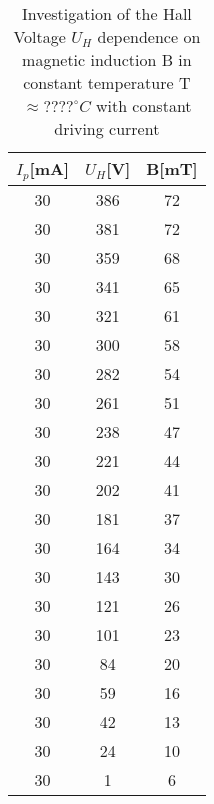 \documentclass[a4paper,12pt]{article}
\begin{document}
\begin{table}[H]
\caption{Investigation of the Hall Voltage $U_H$ dependence on magnetic induction B in constant temperature T$\approx????^\circ C$ with constant driving current}
\begin{minipage}{.5\linewidth}
\centering
\begin{tabular}{|c|c|c|}
\hline
$I_p$[mA] & $U_H$[V] & B[mT] \\   
\hline
\hline
30    & 386	& 72\\
\hline
30    & 381	&	72\\
\hline
30    & 359	&	68\\
\hline
30    & 341	&	65\\
\hline
30    & 321	&	61\\
\hline
30    & 300	&	58\\
\hline
30    & 282	&	54\\
\hline
30    & 261	&	51\\
\hline
30    & 238	&	47\\
\hline
30    & 221	&	44\\
\hline
30    & 202	&	41\\
\hline
30    & 181	&	37\\
\hline
30    & 164	&	34\\
\hline
30    & 143	&	30\\
\hline
30    & 121	&	26\\
\hline
30    & 101	&	23\\
\hline
30    & 84	&	20\\
\hline
30    & 59	&	16\\
\hline
30    & 42	&	13\\
\hline
30    & 24	&	10\\
\hline
30    & 1	&	6\\
\hline


\end{tabular}
\end{minipage}
\end{table}
\end{document}
